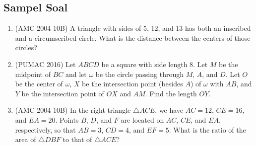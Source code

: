 \documentclass[11pt]{scrartcl}
\begin{document}
\subsection{Sampel Soal}
\begin{enumerate}
    \item (AMC 2004 10B) A triangle with sides of 5, 12, and 13 has both an inscribed and a circumscribed circle. What is the distance between the centers of those circles?
    
    \item (PUMAC 2016) Let $ABCD$ be a square with side length 8. Let $M$ be the midpoint of $BC$ and let $\omega$ be the circle passing through $M$, $A$, and $D$. Let $O$ be the center of $\omega$, $X$ be the intersection point (besides $A$) of $\omega$ with $AB$, and $Y$ be the intersection point of $OX$ and $AM$. Find the length $OY$.

    \item (AMC 2004 10B) In the right triangle $\triangle ACE$, we have $AC = 12$, $CE = 16$, and $EA = 20$. Points $B$, $D$, and $F$ are located on $AC$, $CE$, and $EA$, respectively, so that $AB = 3$, $CD = 4$, and $EF = 5$. What is the ratio of the area of $\triangle DBF$ to that of $\triangle ACE$?
\end{enumerate}
\end{document}
